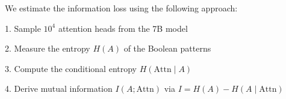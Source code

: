We estimate the information loss using the following approach:






1. Sample $10^4$ attention heads from the 7B model






2. Measure the entropy $H(A)$ of the Boolean patterns






3. Compute the conditional entropy $H(\text{Attn} \mid A)$






4. Derive mutual information $I(A; \text{Attn})$ via $I = H(A) - H(A \mid \text{Attn})$













